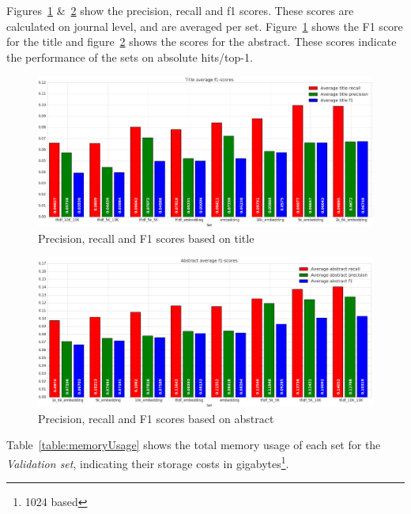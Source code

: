 \documentclass[../../Thesis.tex]{subfiles}
\begin{document}
\clearpage
{}
Figures~\ref{figure:f1Title} \&~\ref{figure:f1Abstract} show the precision, recall and f1 scores. These scores are calculated on journal level, and are averaged per set. Figure~\ref{figure:f1Title} shows the F1 score for the title and figure~\ref{figure:f1Abstract} shows the scores for the abstract. These scores indicate the performance of the sets on absolute hits/top-1.
\begin{figure}[hbt]
\includegraphics[width=6.5in]{Plots/Title_avg_f1}
\caption{Precision, recall and F1 scores based on title}\label{figure:f1Title}
\end{figure}
\begin{figure}[htb]
\includegraphics[width=6.5in]{Plots/Abstract_avg_f1}
\caption{Precision, recall and F1 scores based on abstract}\label{figure:f1Abstract}
\end{figure}
\clearpage
{}
Table~\ref{table:memoryUsage} shows the total memory usage of each set for the \textit{Validation set}, indicating their storage costs in gigabytes\footnote{1024 based}.\\
\end{document}
